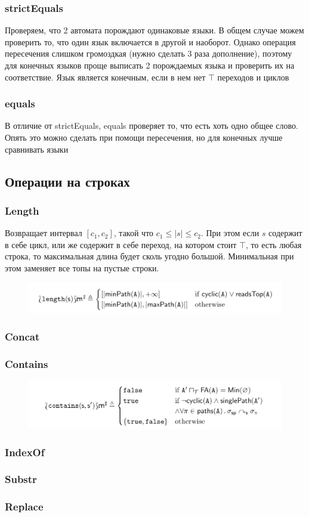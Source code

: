 \subsubsection*{strictEquals}
Проверяем, что 2 автомата порождают одинаковые языки. В общем случае можем проверить то, что один язык включается в другой и наоборот. Однако операция пересечения слишком громоздкая (нужно сделать 3 раза дополнение), поэтому для конечных языков проще выписать 2 порождаемых языка и проверить их на соответствие. Язык является конечным, если в нем нет $\top$ переходов и циклов

\subsubsection*{equals}
В отличие от strictEquals, equals проверяет то, что есть хоть одно общее слово. Опять это можно сделать при помощи пересечения, но для конечных лучше сравнивать языки

\newpage
\subsection{Операции на строках}
\subsubsection*{Length}
Возвращает интервал $[c_1, c_2]$, такой что $c_1 \leq |s| \leq c_2$. При этом если $s$ содержит в себе цикл, или же содержит в себе переход, на котором стоит $\top$, то есть любая строка, то максимальная длина будет сколь угодно большой. Минимальная при этом заменяет все топы на пустые строки.
\begin{figure}[H]
\includegraphics[width=\textwidth]{images/tarsis-length.png}\hfill
\end{figure}
    

\subsubsection*{Concat}
\subsubsection*{Contains}

\begin{figure}[H]
\includegraphics[width=\textwidth]{images/tarsis-contains.png}\hfill
\end{figure}
        
\subsubsection*{IndexOf}

\subsubsection*{Substr}

\subsubsection*{Replace}